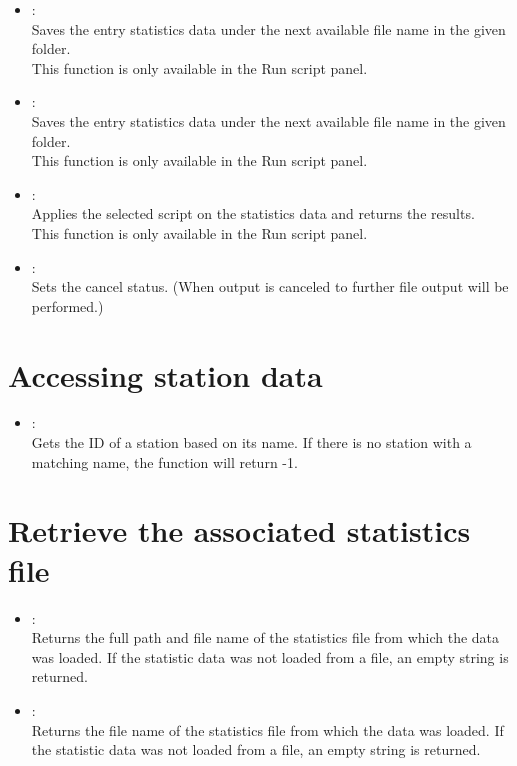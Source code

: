 \begin{itemize}

\item
{}:\\
Saves the entry statistics data under the next available file name in the given folder.\\
This function is only available in the Run script panel.

\item
{}:\\
Saves the entry statistics data under the next available file name in the given folder.\\
This function is only available in the Run script panel.

\item
{}:\\
Applies the selected script on the statistics data and returns the results.\\
This function is only available in the Run script panel.

\item
{}:\\
Sets the cancel status. (When output is canceled to further file output will be performed.)

\end{itemize}

\section{Accessing station data}

\begin{itemize}

\item
{}:\\
Gets the ID of a station based on its name.
If there is no station with a matching name, the function will return -1.

\end{itemize}

\section{Retrieve the associated statistics file}

\begin{itemize}

\item
{}:\\
Returns the full path and file name of the statistics file from which the data was loaded.
If the statistic data was not loaded from a file, an empty string is returned.

\item
{}:\\
Returns the file name of the statistics file from which the data was loaded.
If the statistic data was not loaded from a file, an empty string is returned.

\end{itemize}



